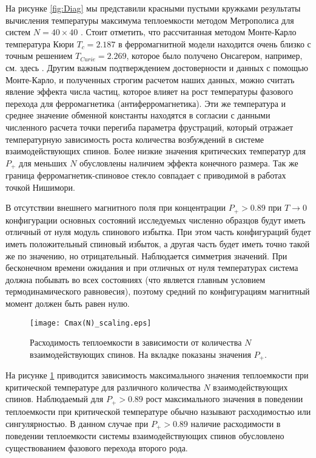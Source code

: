 На рисунке \ref{fig:Diag} мы представили красными пустыми кружками результаты вычисления температуры максимума теплоемкости методом Метрополиса для систем $N=40\times40$  \cite{Metropolis53}. Стоит отметить, что рассчитанная методом Монте-Карло температура Кюри $T_{c}=2.187$ в ферромагнитной модели находится очень близко с точным решением $T_{Curie}=2.269$, которое было получено Онсагером, например, см. здесь \cite{Zaiman1953}. Другим важным подтверждением достоверности и данных с помощью Монте-Карло, и полученных строгим расчетом наших данных, можно считать явление эффекта числа частиц, которое влияет на рост температуры фазового перехода для ферромагнетика (антиферромагнетика). Эти же температура и среднее значение обменной константы находятся в согласии с данными численного расчета точки перегиба параметра фрустраций, который отражает температурную зависимость роста количества возбуждений в системе взаимодействующих спинов. Более низкие значения критических температур для $P_+$ для меньших $N$ обусловлены наличием эффекта конечного размера. Так же граница ферромагнетик-спиновое стекло совпадает с приводимой в работах \cite{Hasenbusch2008, nishimori1980exact} точкой Нишимори.

В отсутствии внешнего магнитного поля при концентрации $P_{+}>0.89$ при $T \rightarrow0$ конфигурации основных состояний исследуемых численно образцов будут иметь отличный от нуля модуль спинового избытка. При этом часть конфигураций будет иметь положительный спиновый избыток, а другая часть будет иметь точно такой же по значению, но отрицательный. Наблюдается симметрия значений. При бесконечном времени ожидания и при отличных от нуля температурах система должна побывать во всех состояниях (что является главным условием термодинамического равновесия), поэтому средний по конфигурациям магнитный момент должен быть равен нулю. 

\begin{figure}[!ht]
	\centering
	\texttt{[image: Cmax(N)\_scaling.eps]}
	\caption{Расходимость теплоемкости в зависимости от количества  $N$ взаимодействующих спинов. На вкладке показаны значения $P_+$.}
	\label{fig:Cmax(N)_scaling}
\end{figure}

На рисунке \ref{fig:Cmax(N)_scaling} приводится зависимость максимального значения теплоемкости при критической температуре для различного количества $N$ взаимодействующих спинов. Наблюдаемый для $P_+>0.89$ рост максимального значения в поведении теплоемкости при критической температуре обычно называют расходимостью или сингулярностью. В данном случае при $P_+>0.89$ наличие расходимости в поведении теплоемкости системы взаимодействующих спинов обусловлено существованием фазового перехода второго рода. 

